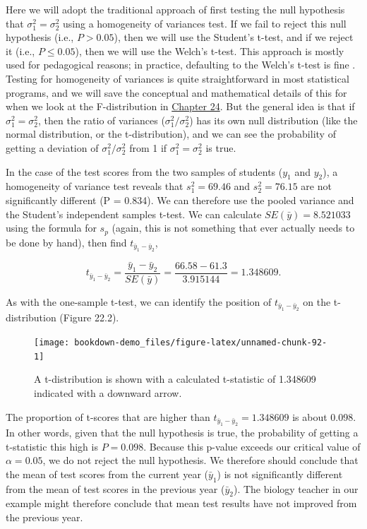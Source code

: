 \documentclass[
]{scrbook}
\begin{document}
Here we will adopt the traditional approach of first testing the null hypothesis that \(\sigma^{2}_{1} = \sigma^{2}_{2}\) using a homogeneity of variances test.
If we fail to reject this null hypothesis (i.e., \(P > 0.05\)), then we will use the Student's t-test, and if we reject it (i.e., \(P \leq 0.05\)), then we will use the Welch's t-test.
This approach is mostly used for pedagogical reasons; in practice, defaulting to the Welch's t-test is fine \citep{Ruxton2006, Delacre2017}.
Testing for homogeneity of variances is quite straightforward in most statistical programs, and we will save the conceptual and mathematical details of this for when we look at the F-distribution in \protect\hyperlink{Chapter_24}{Chapter 24}.
But the general idea is that if \(\sigma^{2}_{1} = \sigma^{2}_{2}\), then the ratio of variances (\(\sigma^{2}_{1}/\sigma^{2}_{2}\)) has its own null distribution (like the normal distribution, or the t-distribution), and we can see the probability of getting a deviation of \(\sigma^{2}_{1}/\sigma^{2}_{2}\) from 1 if \(\sigma^{2}_{1} = \sigma^{2}_{2}\) is true.

In the case of the test scores from the two samples of students (\(y_{1}\) and \(y_{2}\)), a homogeneity of variance test reveals that \(s^{2}_{1} = 69.46\) and \(s^{2}_{2} = 76.15\) are not significantly different (P = 0.834).
We can therefore use the pooled variance and the Student's independent samples t-test.
We can calculate \(SE(\bar{y}) = 8.521033\) using the formula for \(s_{p}\) (again, this is not something that ever actually needs to be done by hand), then find \(t_{\bar{y}_{1} - \bar{y}_{2}}\),

\[t_{\bar{y}_{1} - \bar{y}_{2}} = \frac{\bar{y}_{1} - \bar{y}_{2}}{SE(\bar{y})} = \frac{66.58 - 61.3}{3.915144} = 1.348609.\]

As with the one-sample t-test, we can identify the position of \(t_{\bar{y}_{1} - \bar{y}_{2}}\) on the t-distribution (Figure 22.2).

\begin{figure}
\texttt{[image: bookdown-demo\_files/figure-latex/unnamed-chunk-92-1]} \caption{A t-distribution is shown with a calculated t-statistic of 1.348609 indicated with a downward arrow.}\label{fig:unnamed-chunk-92}
\end{figure}

The proportion of t-scores that are higher than \(t_{\bar{y}_{1} - \bar{y}_{2}} = 1.348609\) is about 0.098.
In other words, given that the null hypothesis is true, the probability of getting a t-statistic this high is \(P = 0.098\).
Because this p-value exceeds our critical value of \(\alpha = 0.05\), we do not reject the null hypothesis.
We therefore should conclude that the mean of test scores from the current year (\(\bar{y}_{1}\)) is not significantly different from the mean of test scores in the previous year (\(\bar{y}_{2}\)).
The biology teacher in our example might therefore conclude that mean test results have not improved from the previous year.
\end{document}
